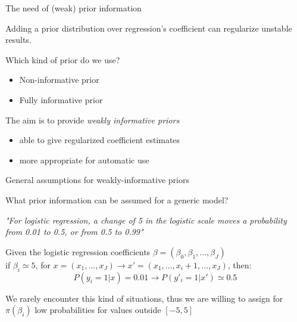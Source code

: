 \documentclass{beamer}
\begin{document}
\begin{frame}[t]{The need of (weak) prior information}
		
		Adding a prior distribution over regression's coefficient can regularize unstable results.
		\vspace{0.4cm}
		
		Which kind of prior do we use?
		
		\begin{itemize}
			\item Non-informative prior
			\item Fully informative prior
		\end{itemize}
	
		\vspace{0.3cm}
		The aim is to provide \textit{weakly informative priors}
		\begin{itemize}
			\item able to give regularized coefficient estimates
			\item more appropriate for automatic use
		\end{itemize}
	
\end{frame}

\begin{frame}{General assumptions for weakly-informative priors}
	
	 What prior information can be assumed for a generic model?
	
	\vspace{0.2cm}
	
	\textit{"For logistic regression, a change of 5 in the logistic scale moves a probability from 0.01 to 0.5, or from 0.5 to 0.99"}
	
	\vspace{0.2cm}
	
	Given the logistic regression coefficients $ \beta = (\beta_0, \beta_1, ..., \beta_J ) $ \\
	if $\beta_i \simeq 5$, for $x=(x_1, ..., x_J) \rightarrow x' =(x_1, ...,x_i+1, ..., x_J)$, then:
	$$ P(y_i=1 | x)=0.01 \rightarrow P(y'_i=1 | x') \simeq 0.5 $$ 
	
	
	We rarely encounter this kind of situations, thus  we are willing to assign for $\pi(\beta_i)$ low probabilities for values outside $ [-5, 5]$
	
\end{frame}
\end{document}
